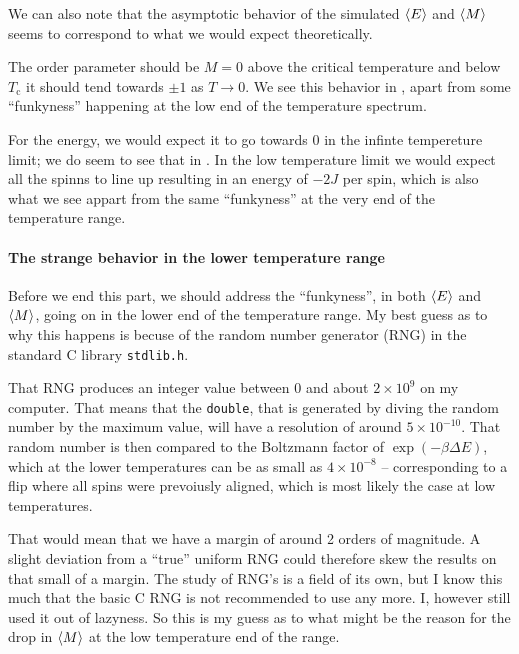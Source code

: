 \documentclass[11pt,letter, swedish, english
]{article}
\newcommand{\Tc}{\ensuremath{T_{\text{c}}}}
\newcommand{\DE}{\ensuremath{\Delta{E}}}
\begin{document}
We can also note that the asymptotic behavior of the simulated
$\ev{E}$ and $\ev{M}$ seems to correspond to what we would expect
theoretically. 

The order parameter should be $M=0$ above the critical
temperature and below $\Tc$ it should tend towards $\pm1$ as
$T\to0$. We see this behavior in , apart from some
``funkyness'' happening at the low end of the temperature spectrum. 

For the energy, we would expect it to go towards 0 in the infinte
tempereture limit; we do seem to see that in . In the
low temperature limit we would expect all the spinns to line up
resulting in an energy of $-2J$ per spin\footnotemark{}, which is also
what we see appart from the same ``funkyness'' at the very end of the
temperature range. 

\paragraph{The strange behavior in the lower temperature range}
Before we end this part, we should address the ``funkyness'', in both
$\ev{E}$ and $\ev{M}$, going on in the lower end of the temperature
range. My best guess as to why this happens is becuse of the random
number generator (RNG) in the standard C library \texttt{stdlib.h}.

That RNG produces an integer value between 0 and about $2\times10^9$
on my computer. That means that the \texttt{double}, that is generated
by diving the random number by the maximum value, will have a
resolution of around $5\times10^{-10}$. 
That random number is then compared to the Boltzmann factor of
$\exp(-\beta\DE)$, which at the lower temperatures can be as small as
$4\times10^{-8}$ -- corresponding to a flip where all spins were
prevoiusly aligned, which is most likely the case at low temperatures.  

That would mean that we have a margin of around 2 orders of magnitude.
A slight deviation from a ``true'' uniform RNG could therefore skew the
results on that small of a margin. The study of RNG's is a field of
its own, but I know this much that the basic C RNG is not recommended
to use any more. I, however still used it out of lazyness. So this is
my guess as to what might be the reason for the drop in $\ev{M}$ at
the low temperature end of the range. 
\end{document}
